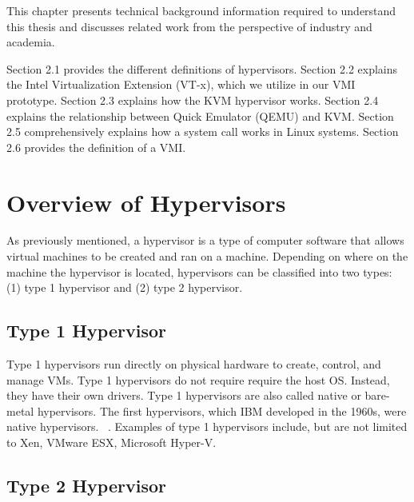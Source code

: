 \documentclass{report}
\begin{document}
\begin{spacing}{1.5}
{\large
This chapter presents technical background information required to understand this
thesis and discusses related work from the perspective of industry and academia. 
\newline
}

{\large
Section 2.1 provides the different definitions of hypervisors. 
Section 2.2 explains the Intel Virtualization Extension (VT-x), which we utilize in our VMI prototype. 
Section 2.3 explains how the KVM hypervisor works. 
Section 2.4 explains the relationship between Quick Emulator (QEMU) and KVM. 
Section 2.5 comprehensively explains how a system call works in Linux systems. 
Section 2.6 provides the definition of a VMI. 
\newline
}









\section{Overview of Hypervisors}

{\large
As previously mentioned, a hypervisor is a type of computer software that allows virtual machines to be created and ran on a machine. Depending on where on the machine the hypervisor is located, hypervisors can be classified into two types: (1) type 1 hypervisor and (2) type 2 hypervisor.
\newline
}

\subsection{Type 1 Hypervisor}

{\large
Type 1 hypervisors run directly on physical hardware to create, control, and manage VMs. Type 1 hypervisors do not require  require the host OS. Instead, they have their own drivers. Type 1 hypervisors are also called native or bare-metal hypervisors. The first hypervisors, which IBM developed in the 1960s, were native hypervisors. ~\cite{meier2008ibm}. Examples of type 1 hypervisors include, but are not limited to Xen, VMware ESX, Microsoft Hyper-V.
\newline
}


\subsection{Type 2 Hypervisor}


\end{spacing}
\end{document}

